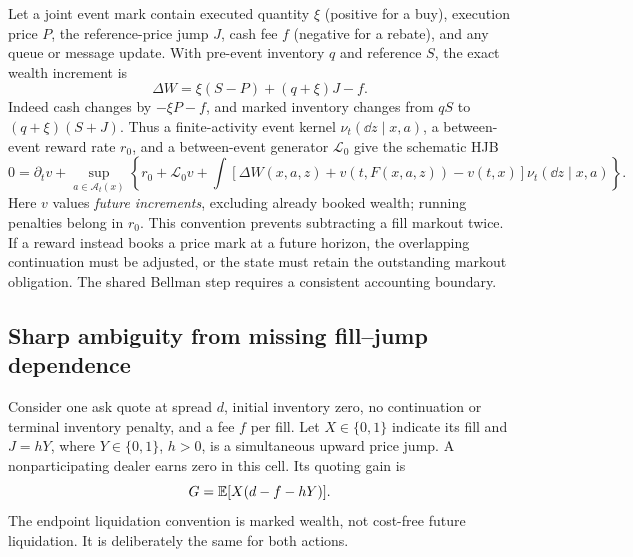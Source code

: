 Let a joint event mark contain executed quantity \(\xi\) (positive for a
buy), execution price \(P\), the reference-price jump \(J\), cash fee
\(f\) (negative for a rebate), and any queue or message update. With
pre-event inventory \(q\) and reference \(S\), the exact wealth increment is
\begin{equation}\label{eq:jointmarkedcharge}
 \Delta W=\xi(S-P)+(q+\xi)J-f.
\end{equation}
Indeed cash changes by \(-\xi P-f\), and marked inventory changes from
\(qS\) to \((q+\xi)(S+J)\). Thus a finite-activity event kernel
\(\nu_t(\dd z\mid x,a)\), a between-event reward rate \(r_0\), and a
between-event generator \(\mathcal L_0\) give the schematic HJB
\begin{equation}\label{eq:jointmarkedhjb}
0=\partial_t v+\sup_{a\in\mathcal A_t(x)}
 \left\{r_0+\mathcal L_0v+
 \int[\Delta W(x,a,z)+v(t,F(x,a,z))-v(t,x)]
          \nu_t(\dd z\mid x,a)\right\}.
\end{equation}
Here \(v\) values \emph{future increments}, excluding already booked
wealth; running penalties belong in \(r_0\). This convention prevents
subtracting a fill markout twice. If a reward instead books a price mark
at a future horizon, the overlapping continuation must be adjusted, or
the state must retain the outstanding markout obligation. The shared
Bellman step requires a consistent accounting boundary.

\subsection{Sharp ambiguity from missing fill--jump dependence}

Consider one ask quote at spread \(d\), initial inventory zero, no
continuation or terminal inventory penalty, and a fee \(f\) per fill.
Let \(X\in\{0,1\}\) indicate its fill and \(J=hY\), where
\(Y\in\{0,1\}\), \(h>0\), is a simultaneous upward price jump. A
nonparticipating dealer earns zero in this cell. Its quoting gain is
\[
 G=\mathbb E[X(d-f-hY)].
\]
The endpoint liquidation convention is marked wealth, not cost-free
future liquidation. It is deliberately the same for both actions.

